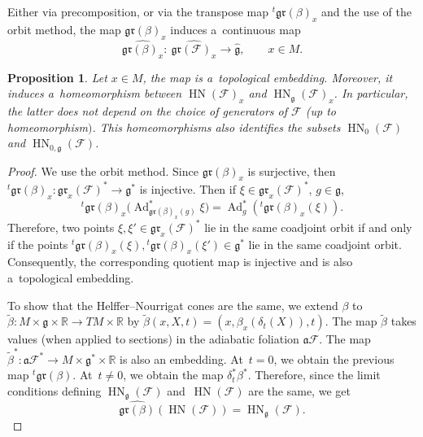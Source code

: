 \documentclass[10pt,a4paper]{article}
\newcommand{\tsp}[1]{{}^t \! #1} %
\newcommand{\R}{\mathbb R} %
\newcommand{\F}{\mathcal{F}} %
\newcommand{\Ad}{\operatorname{Ad}} %
\newcommand{\g}{\mathfrak{g}} %
\newcommand{\HN}{\operatorname{HN}} %
\newcommand{\Fb}{\mathcal{F}} %
\newcommand{\gr}{\mathfrak{gr}} %
\numberwithin{equation}{section}
\newtheorem{prop}[thm]{Proposition}
\theoremstyle{definition}
\begin{document}
Either via precomposition, or via the transpose map $\tsp{}\gr(\beta)_x $ and the use of the orbit method, the map $\gr(\beta)_x$ induces a~continuous map
\[\widehat{\gr(\beta)_x} \colon\ \widehat{\gr(\Fb)_x} \to \widehat{\g},\qquad x \in M.\]

\begin{prop}\label{Proposition : Independence HN}
 Let $x\in M$, the map \smash{$\widehat{\gr(\beta)_x}$} is a~topological embedding. Moreover, it induces a~homeomorphism between $\HN(\Fb)_x$ and $\HN_{\g}(\Fb)_x$. In particular, the latter does not depend on the choice of generators of $\Fb$ {\rm(}up to homeomorphism$)$. This homeomorphisms also identifies the subsets $\HN_0(\F)$ and $\HN_{0,\g}(\F)$.
\end{prop}

\begin{proof}
 We use the orbit method. Since $\gr(\beta)_x$ is surjective, then $\tsp\gr(\beta)_x\colon \gr_x(\Fb)^* \to \g^*$ is injective. Then if $\xi \in \gr_x(\Fb)^*$, $g \in \g$,
 \[\tsp\gr(\beta)_x\bigl(\Ad^*_{\gr(\beta)_x(g)}\xi\bigr) = \Ad^*_g(\tsp\gr(\beta)_x(\xi)).
 \]
 Therefore, two points $\xi,\xi' \in \gr_x(\Fb)^*$ lie in the same coadjoint orbit if and only if the points $\tsp\gr(\beta)_x(\xi),\tsp\gr(\beta)_x(\xi') \in \g^*$ lie in the same coadjoint orbit. Consequently, the corresponding quotient map \smash{$\widehat{\gr(\beta)} \colon \widehat{\gr_x(\Fb)} \to \widehat{\g}$} is injective and is also a~topological embedding.

 To show that the Helffer--Nourrigat cones are the same, we extend $\beta$ to $\widetilde{\beta} \colon M \times \g \times \R \to TM \times \R$ by $\widetilde{\beta}(x,X,t) = (x,\beta_x(\delta_t(X)),t)$.
 The map $\widetilde{\beta}$ takes values (when applied to sections) in the adiabatic foliation $\mathfrak{a}\F$. The map $\widetilde{\beta}^* \colon \mathfrak{a}\F^*\to M \times \g^* \times \R$ is also an embedding. At~${t=0}$, we obtain the previous map $\tsp\gr(\beta)$. At~${t\neq 0}$, we obtain the map $\delta^*_t\beta^*$. Therefore, since the limit conditions defining $\HN_{\g}(\F)$ and~$\HN(\F)$ are the same, we get
 \[\widehat{\gr(\beta)}(\HN(\Fb)) = \HN_{\g}(\Fb).\tag*{\qed}
 \]\renewcommand{\qed}{}
\end{proof}
\end{document}
